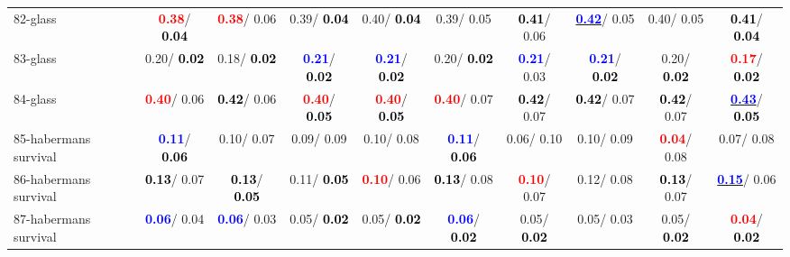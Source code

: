 \begin{table}[h]
\begin{center}
{\begin{tabular}{lc|c|c|c|c|c|c|c|c}
82-glass & \textcolor{red}{\textbf{  0.38}}/\textcolor{black}{\textbf{  0.04}} & \textcolor{red}{\textbf{  0.38}}/  0.06 &   0.39/\textcolor{black}{\textbf{  0.04}} &   0.40/\textcolor{black}{\textbf{  0.04}} &   0.39/  0.05 & \textcolor{black}{\textbf{  0.41}}/  0.06 & \underline{\textcolor{blue}{\textbf{  0.42}}}/  0.05 &   0.40/  0.05 & \textcolor{black}{\textbf{  0.41}}/\textcolor{black}{\textbf{  0.04}} \\
83-glass &   0.20/\textcolor{black}{\textbf{  0.02}} &   0.18/\textcolor{black}{\textbf{  0.02}} & \textcolor{blue}{\textbf{  0.21}}/\textcolor{black}{\textbf{  0.02}} & \textcolor{blue}{\textbf{  0.21}}/\textcolor{black}{\textbf{  0.02}} &   0.20/\textcolor{black}{\textbf{  0.02}} & \textcolor{blue}{\textbf{  0.21}}/  0.03 & \textcolor{blue}{\textbf{  0.21}}/\textcolor{black}{\textbf{  0.02}} &   0.20/\textcolor{black}{\textbf{  0.02}} & \textcolor{red}{\textbf{  0.17}}/\textcolor{black}{\textbf{  0.02}} \\
84-glass & \textcolor{red}{\textbf{  0.40}}/  0.06 & \textcolor{black}{\textbf{  0.42}}/  0.06 & \textcolor{red}{\textbf{  0.40}}/\textcolor{black}{\textbf{  0.05}} & \textcolor{red}{\textbf{  0.40}}/\textcolor{black}{\textbf{  0.05}} & \textcolor{red}{\textbf{  0.40}}/  0.07 & \textcolor{black}{\textbf{  0.42}}/  0.07 & \textcolor{black}{\textbf{  0.42}}/  0.07 & \textcolor{black}{\textbf{  0.42}}/  0.07 & \underline{\textcolor{blue}{\textbf{  0.43}}}/\textcolor{black}{\textbf{  0.05}} \\
85-habermans survival & \textcolor{blue}{\textbf{  0.11}}/\textcolor{black}{\textbf{  0.06}} &   0.10/  0.07 &   0.09/  0.09 &   0.10/  0.08 & \textcolor{blue}{\textbf{  0.11}}/\textcolor{black}{\textbf{  0.06}} &   0.06/  0.10 &   0.10/  0.09 & \textcolor{red}{\textbf{  0.04}}/  0.08 &   0.07/  0.08 \\ \hline
86-habermans survival & \textcolor{black}{\textbf{  0.13}}/  0.07 & \textcolor{black}{\textbf{  0.13}}/\textcolor{black}{\textbf{  0.05}} &   0.11/\textcolor{black}{\textbf{  0.05}} & \textcolor{red}{\textbf{  0.10}}/  0.06 & \textcolor{black}{\textbf{  0.13}}/  0.08 & \textcolor{red}{\textbf{  0.10}}/  0.07 &   0.12/  0.08 & \textcolor{black}{\textbf{  0.13}}/  0.07 & \underline{\textcolor{blue}{\textbf{  0.15}}}/  0.06 \\
87-habermans survival & \textcolor{blue}{\textbf{  0.06}}/  0.04 & \textcolor{blue}{\textbf{  0.06}}/  0.03 &   0.05/\textcolor{black}{\textbf{  0.02}} &   0.05/\textcolor{black}{\textbf{  0.02}} & \textcolor{blue}{\textbf{  0.06}}/\textcolor{black}{\textbf{  0.02}} &   0.05/\textcolor{black}{\textbf{  0.02}} &   0.05/  0.03 &   0.05/\textcolor{black}{\textbf{  0.02}} & \textcolor{red}{\textbf{  0.04}}/\textcolor{black}{\textbf{  0.02}} \\

\end{tabular}}
\end{center}
\end{table}
